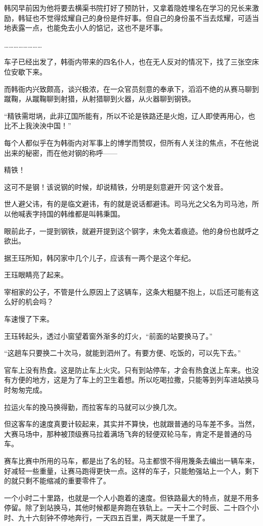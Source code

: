 韩冈早前因为他将要去横渠书院打好了预防针，又拿着隐姓埋名在学习的兄长来激励，韩钲也不觉得炫耀自己的身份是件好事。但自己的身份虽不当去炫耀，可适当地表露一点，也能免去小人的惦记，这也不是坏事。

……………………

车子已经出发了，韩衙内带来的四名仆人，也在无人反对的情况下，找了三张空床位安歇下来。

而韩衙内兴致颇高，谈兴极浓，在一众官员刻意的奉承下，滔滔不绝的从赛马聊到蹴鞠，从蹴鞠聊到射猎，从射猎聊到火器，从火器聊到钢铁。

“精铁需坩埚，此非辽国所能有，所以不论是铁路还是火炮，辽人即使再用心，也比不上我泱泱中国！”

每个人都似乎在为韩衙内对军事上的博学而赞叹，但所有人关注的焦点，不在他说出来的秘密，而在他对钢的称呼——

精铁！

这可不是钢！该说钢的时候，却说精铁，分明是刻意避开‘冈’这个发音。

世人避父讳，有的是临文避讳，有的就是说话都避讳。司马光之父名为司马池，所以他喊表字持国的韩维都是叫韩秉国。

眼前此子，一提到钢铁，就避开提到这个钢字，未免太着痕迹。他的身份也就呼之欲出。

据王珏所知，韩冈家中几个儿子，应该有一两个是这个年纪。

王珏眼睛亮了起来。

宰相家的公子，不管是什么原因上了这辆车，这条大粗腿不抱上，以后还可能有这么好的机会吗？

车速慢了下来。

王珏转起头，透过小窗望着窗外渐多的灯火，“前面的站要换马了。”

“这趟车只要换二十次马，就能到泗州了。有要方便、吃饭的，可以先下去。”

官车上没有热食。这是防止车上火灾。只有到站停车，才会有热食送上车来。也没有方便的地方，这是为了车上的卫生着想。所以吃喝拉撒，只能等到列车进站换马时匆匆完成。

拉运火车的挽马换得勤，而拉客车的马就可以少换几次。

但这客车的速度真要计较起来，其实并不算快，也就跟普通的马车差不多。当然，大赛马场中，那种被顶级赛马拉着满场飞奔的轻便双轮马车，肯定不是普通的马车。

赛车比赛中所用的马车，都是出了名的轻。马主都恨不得用篾条去编出一辆车来，好减轻一些重量，让赛马跑得更快一点。这样的车子，只能勉强站上一个人，剩下的就只剩不能缩减的重要零件了。

一个小时二十里路，也就是一个人小跑着的速度。但铁路最大的特点，就是不用多停留。除了到站换马，其他时候都是奔跑在铁轨上。一天十二个时辰、二十四个小时、九十六刻钟不停地奔行，一天四五百里，两天就是一千里了。

